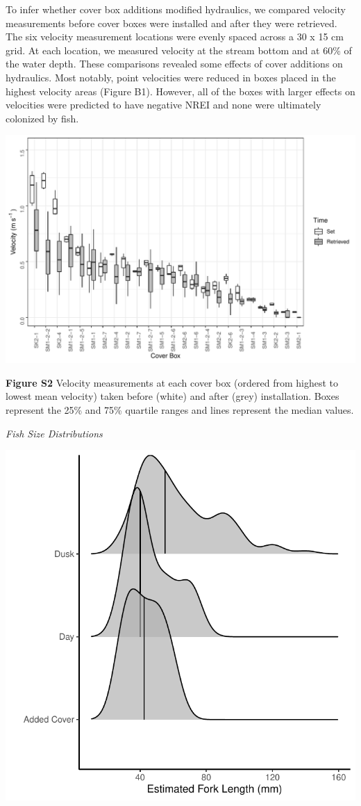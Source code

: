 \documentclass[]{article}
\begin{document}
To infer whether cover box additions modified hydraulics, we compared
velocity measurements before cover boxes were installed and after they
were retrieved. The six velocity measurement locations were evenly
spaced across a 30 x 15 cm grid. At each location, we measured velocity
at the stream bottom and at 60\% of the water depth. These comparisons
revealed some effects of cover additions on hydraulics. Most notably,
point velocities were reduced in boxes placed in the highest velocity
areas (Figure B1). However, all of the boxes with larger effects on
velocities were predicted to have negative NREI and none were ultimately
colonized by fish.

\includegraphics{Final_figures/Appendix_S2}

\textbf{Figure S2} Velocity measurements at each cover box (ordered from
highest to lowest mean velocity) taken before (white) and after (grey)
installation. Boxes represent the 25\% and 75\% quartile ranges and
lines represent the median values.

\clearpage

\emph{Fish Size Distributions}

\includegraphics{Final_figures/Appendix_S3}
\end{document}
